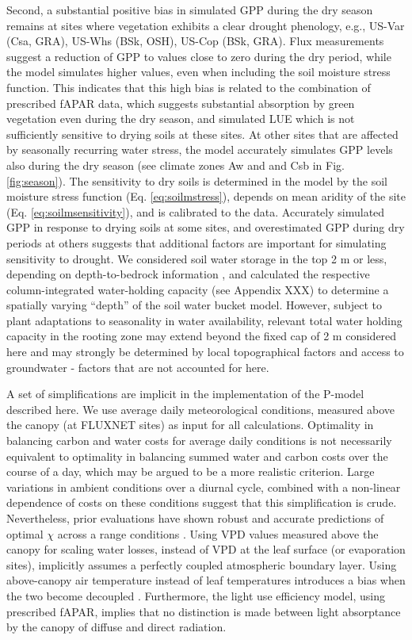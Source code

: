 \documentclass{myreport}
\begin{document}
Second, a substantial positive bias in simulated GPP during the dry season remains at sites where vegetation exhibits a clear drought phenology, e.g., US-Var (Csa, GRA), US-Whs (BSk, OSH), US-Cop (BSk, GRA). Flux measurements suggest a reduction of GPP to values close to zero during the dry period, while the model simulates higher values, even when including the soil moisture stress function. This indicates that this high bias is related to the combination of prescribed fAPAR data, which suggests substantial absorption by green vegetation even during the dry season, and simulated LUE which is not sufficiently sensitive to drying soils at these sites. At other sites that are affected by seasonally recurring water stress, the model accurately simulates GPP levels also during the dry season (see climate zones Aw and and Csb in Fig. \ref{fig:season}). The sensitivity to dry soils is determined in the model by the soil moisture stress function (Eq. \ref{eq:soilmstress}), depends on mean aridity of the site (Eq. \ref{eq:soilmsensitivity}), and is calibrated to the data. Accurately simulated GPP in response to drying soils at some sites, and overestimated GPP during dry periods at others suggests that additional factors are important for simulating sensitivity to drought. We considered soil water storage in the top 2 m or less, depending on depth-to-bedrock information \citep{Hengl2014-jm}, and calculated the respective column-integrated water-holding capacity (see Appendix XXX) to determine a spatially varying ``depth'' of the soil water bucket model. However, subject to plant adaptations to seasonality in water availability, relevant total water holding capacity in the rooting zone may extend beyond the fixed cap of 2 m considered here \citep{yang16wrr} and may strongly be determined by local topographical factors and access to groundwater \citep{fan13sci, fan17pnas} - factors that are not accounted for here.

A set of simplifications are implicit in the implementation of the P-model described here. We use average daily meteorological conditions, measured above the canopy (at FLUXNET sites) as input for all calculations. Optimality in balancing carbon and water costs for average daily conditions is not necessarily equivalent to optimality in balancing summed water and carbon costs over the course of a day, which may be argued to be a more realistic criterion. Large variations in ambient conditions over a diurnal cycle, combined with a non-linear dependence of costs on these conditions suggest that this simplification is crude. Nevertheless, prior evaluations have shown robust and accurate predictions of optimal $\chi$ across a range conditions \citep{wang17natpl}. Using VPD values measured above the canopy for scaling water losses, instead of VPD at the leaf surface (or evaporation sites), implicitly assumes a perfectly coupled atmospheric boundary layer. Using above-canopy air temperature instead of leaf temperatures introduces a bias when the two become decoupled \citep{michaletz15tee}. Furthermore, the light use efficiency model, using prescribed fAPAR, implies that no distinction is made between light absorptance by the canopy of diffuse and direct radiation. 
\end{document}
